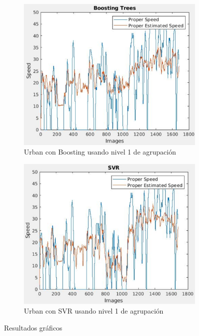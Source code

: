 \begin{figure}[H]
\begin{subfigure}[b]{0.45\linewidth}
    \includegraphics[width=\linewidth]{Figuras/Boosting_Urban(Nivel_1).eps}
    \caption{Urban con Boosting usando nivel 1 de agrupación}
  \end{subfigure}
    \begin{subfigure}[b]{0.45\linewidth}
    \includegraphics[width=\linewidth]{Figuras/SVR_Urban(Nivel_1).eps}
    \caption{Urban con SVR usando nivel 1 de agrupación}
  \end{subfigure}
  \caption{Resultados gráficos}
  \label{fig:grafs}
\end{figure}

